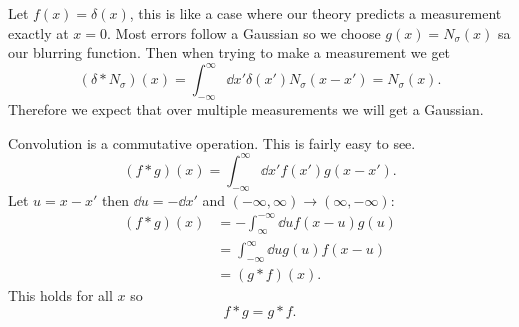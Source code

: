 \documentclass[a4paper]{article}
\newcommand{\convolution}{\mathbin{*}}
\begin{document}
    \begin{example}
        Let \(f(x) = \delta(x)\), this is like a case where our theory predicts a measurement exactly at \(x = 0\).
        Most errors follow a Gaussian so we choose \(g(x) = N_\sigma(x)\) sa our blurring function.
        Then when trying to make a measurement we get
        \[(\delta\convolution N_\sigma)(x) = \int_{-\infty}^{\infty} \dd{x'}\delta(x')N_\sigma(x - x') = N_\sigma(x).\]
        Therefore we expect that over multiple measurements we will get a Gaussian.
    \end{example}
    
    Convolution is a commutative operation.
    This is fairly easy to see.
    \[(f\convolution g)(x) = \int_{-\infty}^{\infty} \dd{x'}f(x') g(x - x').\]
    Let \(u = x - x'\) then \(\dd{u} = -\dd{x'}\) and \((-\infty, \infty)\rightarrow (\infty, -\infty)\):
    \begin{align*}
        (f\convolution g)(x) &= -\int_{\infty}^{-\infty} \dd{u}f(x - u) g(u)\\
        &= \int_{-\infty}^{\infty} \dd{u}g(u)f(x - u)\\
        &= (g \convolution f)(x).
    \end{align*}
    This holds for all \(x\) so
    \[f\convolution g = g\convolution f.\]
    
\end{document}
